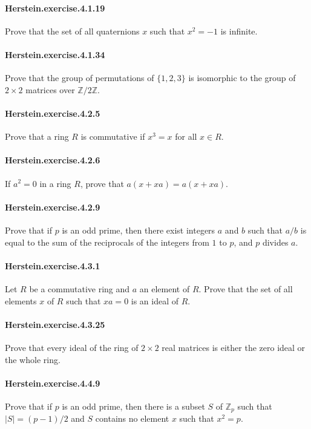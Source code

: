 \documentclass{article}
\begin{document}
\paragraph{Herstein.exercise.4.1.19} Prove that the set of all quaternions $x$ such that $x^2=-1$ is infinite.

\paragraph{Herstein.exercise.4.1.34} Prove that the group of permutations of $\{1, 2, 3\}$ is isomorphic to the group of $2\times 2$ matrices over $\mathbb{Z}/2\mathbb{Z}$.

\paragraph{Herstein.exercise.4.2.5} Prove that a ring $R$ is commutative if $x^3=x$ for all $x\in R$.

\paragraph{Herstein.exercise.4.2.6} If $a^2=0$ in a ring $R$, prove that $a(x+xa)=a(x+xa)$.

\paragraph{Herstein.exercise.4.2.9} Prove that if $p$ is an odd prime, then there exist integers $a$ and $b$ such that $a/b$ is equal to the sum of the reciprocals of the integers from $1$ to $p$, and $p$ divides $a$.

\paragraph{Herstein.exercise.4.3.1} Let $R$ be a commutative ring and $a$ an element of $R$. Prove that the set of all elements $x$ of $R$ such that $xa=0$ is an ideal of $R$.

\paragraph{Herstein.exercise.4.3.25} Prove that every ideal of the ring of $2\times 2$ real matrices is either the zero ideal or the whole ring.

\paragraph{Herstein.exercise.4.4.9} Prove that if $p$ is an odd prime, then there is a subset $S$ of $\mathbb{Z}_p$ such that $|S|=(p-1)/2$ and $S$ contains no element $x$ such that $x^2=p$.
\end{document}
